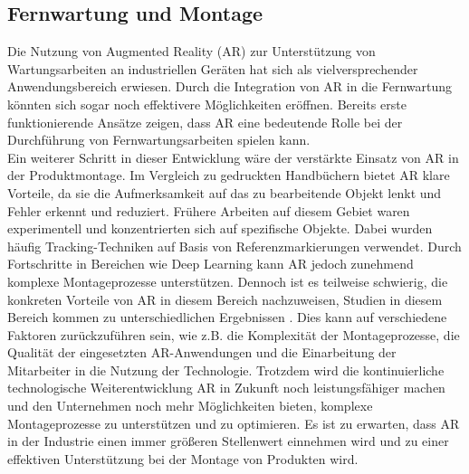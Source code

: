 \subsection{Fernwartung und Montage}
Die Nutzung von Augmented Reality (AR) zur Unterstützung von Wartungsarbeiten
an industriellen Geräten hat sich als vielversprechender Anwendungsbereich
erwiesen. Durch die Integration von AR in die Fernwartung könnten sich sogar
noch effektivere Möglichkeiten eröffnen. Bereits erste funktionierende Ansätze
zeigen, dass AR eine bedeutende Rolle bei der Durchführung von
Fernwartungsarbeiten spielen kann. \cite{masoni2017supporting} \\Ein weiterer
Schritt in dieser Entwicklung wäre der verstärkte Einsatz von AR in der
Produktmontage. Im Vergleich zu gedruckten Handbüchern bietet AR klare
Vorteile, da sie die Aufmerksamkeit auf das zu bearbeitende Objekt lenkt und
Fehler erkennt und reduziert. Frühere Arbeiten auf diesem Gebiet waren
experimentell und konzentrierten sich auf spezifische Objekte. Dabei wurden
häufig Tracking-Techniken auf Basis von Referenzmarkierungen verwendet. Durch
Fortschritte in Bereichen wie Deep Learning kann AR jedoch zunehmend komplexe
Montageprozesse unterstützen. Dennoch ist es teilweise schwierig, die konkreten
Vorteile von AR in diesem Bereich nachzuweisen, Studien in diesem Bereich
kommen zu unterschiedlichen Ergebnissen \cite{tang2003comparative}. Dies kann
auf verschiedene Faktoren zurückzuführen sein, wie z.B. die Komplexität der
Montageprozesse, die Qualität der eingesetzten AR-Anwendungen und die
Einarbeitung der Mitarbeiter in die Nutzung der Technologie. Trotzdem wird die
kontinuierliche technologische Weiterentwicklung AR in Zukunft noch
leistungsfähiger machen und den Unternehmen noch mehr Möglichkeiten bieten,
komplexe Montageprozesse zu unterstützen und zu optimieren. Es ist zu erwarten,
dass AR in der Industrie einen immer größeren Stellenwert einnehmen wird und zu
einer effektiven Unterstützung bei der Montage von Produkten
wird.\cite{8951930}


